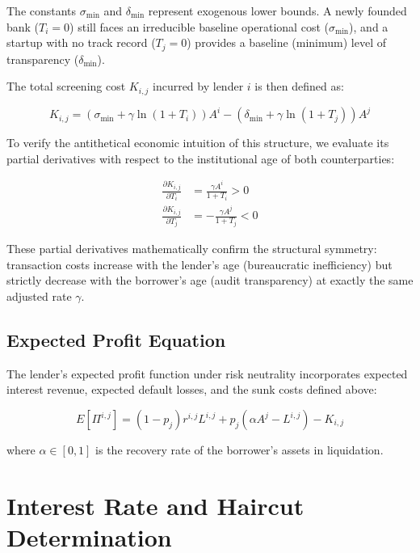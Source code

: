 \documentclass{article}
\begin{document}
\noindent The constants $\sigma_{\min}$ and $\delta_{\min}$ represent exogenous lower bounds. A newly founded bank ($T_i = 0$) still faces an irreducible baseline operational cost ($\sigma_{\min}$), and a startup with no track record ($T_j = 0$) provides a baseline (minimum) level of transparency ($\delta_{\min}$).

\noindent The total screening cost $K_{i,j}$ incurred by lender $i$ is then defined as:

\begin{equation}
    K_{i,j} = \left( \sigma_{\min} + \gamma \ln(1 + T_i) \right) A^i - \left( \delta_{\min} + \gamma \ln(1 + T_j) \right) A^j
\end{equation}

\noindent To verify the antithetical economic intuition of this structure, we evaluate its partial derivatives with respect to the institutional age of both counterparties:

\begin{align}
    \frac{\partial K_{i,j}}{\partial T_i} &= \frac{\gamma A^i}{1 + T_i} > 0 \\[6pt]
    \frac{\partial K_{i,j}}{\partial T_j} &= -\frac{\gamma A^j}{1 + T_j} < 0
\end{align}

\noindent These partial derivatives mathematically confirm the structural symmetry: transaction costs increase with the lender's age (bureaucratic inefficiency) but strictly decrease with the borrower's age (audit transparency) at exactly the same adjusted rate $\gamma$.

\subsection{Expected Profit Equation}

\noindent The lender's expected profit function under risk neutrality incorporates expected interest revenue, expected default losses, and the sunk costs defined above:

\begin{equation}
    E[\Pi^{i,j}] = (1 - p_j) r^{i,j} L^{i,j} + p_j(\alpha A^j - L^{i,j}) - K_{i,j}
\end{equation}

\noindent where $\alpha \in [0,1]$ is the recovery rate of the borrower's assets in liquidation.

\section{Interest Rate and Haircut Determination}
\end{document}
